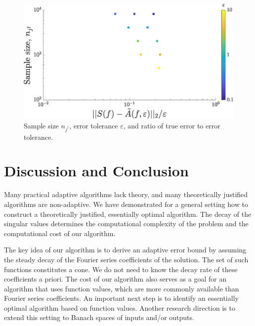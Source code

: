 \documentclass[graybox,footinfo]{svmult}
\begin{document}
\begin{figure}[ht]
 	\centering
 		\includegraphics[width =7.5 cm]{ProgramsImages/SimFourCoefErr.eps}
 	\caption{Sample size $n_{j^{\dagger}}$, error tolerance $\varepsilon$, and ratio of true error to error tolerance. \label{errfig}} %
 \end{figure}

\section{Discussion and Conclusion} \label{sec:conc}
Many practical adaptive algorithms lack theory, and many theoretically justified algorithms are non-adaptive.  We have demonstrated for a general setting how to construct a theoretically justified, essentially optimal algorithm.  The decay of the singular values determines the computational complexity of the problem and the computational cost of our algorithm.  

The key idea of our algorithm is to derive an adaptive error bound by assuming the steady decay of the Fourier series coefficients of the solution.  The set of such functions constitutes a cone.  We do not need to know the decay rate of these coefficients a priori.  The cost of our algorithm also serves as a goal for an algorithm that uses function values, which are more commonly available than Fourier series coefficients.  An important next step is to identify an essentially optimal algorithm based on function values.  Another research direction is to extend this setting to Banach spaces of inputs and/or outputs.




\end{document}
